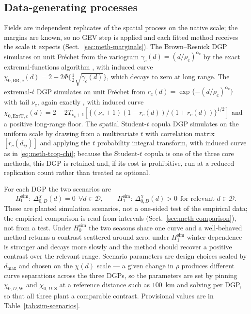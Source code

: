 \subsection{Data-generating processes}\label{sec:sim-dgp}

Fields are independent replicates of the spatial process on the native scale; the margins are known, so no GEV step is applied and each fitted method receives the scale it expects (Sect.~\ref{sec:meth-marginals}). The Brown--Resnick DGP \citep{brown1977,kabluchko2009} simulates on unit Fr\'echet from the variogram \(\gamma_c(d)=(d/\rho_c)^{\alpha_c}\) by the exact extremal-functions algorithm \citep{dombry2016}, with induced curve \(\chi_{0,\mathrm{BR},c}(d)=2-2\Phi\{\tfrac12\sqrt{\gamma_c(d)}\}\), which decays to zero at long range. The extremal-\(t\) DGP \citep{opitz2013} simulates on unit Fr\'echet from \(r_c(d)=\exp\{-(d/\rho_c)^{\alpha_c}\}\) with tail \(\nu_c\), again exactly \citep{dombry2016,thibaud2015}, with induced curve \(\chi_{0,\mathrm{ExtT},c}(d)=2-2T_{\nu_c+1}[\{(\nu_c+1)(1-r_c(d))/(1+r_c(d))\}^{1/2}]\) and a positive long-range floor. The spatial Student-\(t\) copula DGP simulates on the uniform scale by drawing from a multivariate \(t\) with correlation matrix \([r_c(d_{ij})]\) and applying the \(t\) probability integral transform, with induced curve as in \eqref{eq:meth-tcop-chi}; because the Student-\(t\) copula is one of the three core methods, this DGP is retained and, if its cost is prohibitive, run at a reduced replication count rather than treated as optional.

For each DGP the two scenarios are
\begin{equation}\label{eq:sim-hyp}
  H_0^{\mathrm{sim}}:\ \Delta_{0,D}^{\chi}(d)=0\ \ \forall d\in\mathcal D,
  \qquad
  H_1^{\mathrm{sim}}:\ \Delta_{0,D}^{\chi}(d)>0\ \ \text{for relevant } d\in\mathcal D.
\end{equation}
These are planted simulation scenarios, not a one-sided test of the empirical data; the empirical comparison is read from intervals (Sect.~\ref{sec:meth-comparison}), not from a test. \label{sec:sim-scenarios}Under \(H_0^{\mathrm{sim}}\) the two seasons share one curve and a well-behaved method returns a contrast scattered around zero; under \(H_1^{\mathrm{sim}}\) winter dependence is stronger and decays more slowly and the method should recover a positive contrast over the relevant range. Scenario parameters are design choices scaled by \(d_{\max}\) and chosen on the \(\chi(d)\) scale --- a given change in \(\rho\) produces different curve separations across the three DGPs, so the parameters are set by pinning \(\chi_{0,D,\mathrm W}\) and \(\chi_{0,D,\mathrm S}\) at a reference distance such as \(100\)~km and solving per DGP, so that all three plant a comparable contrast. Provisional values are in Table~\ref{tab:sim-scenarios}.

